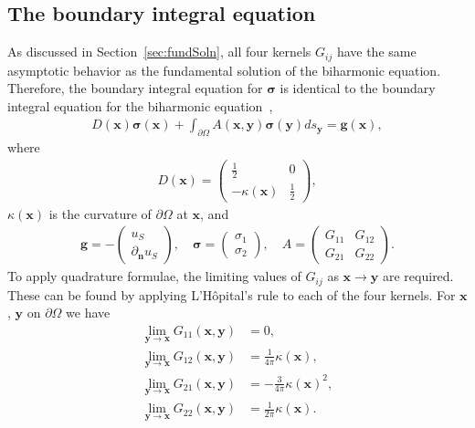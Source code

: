 \documentclass[times]{article}
\newcommand{\bd}{\partial}
\renewcommand{\gg}{\mathbf{g}}
\newcommand{\nn}{\mathbf{n}}
\newcommand{\ssigma}{\boldsymbol{\sigma}}
\newcommand{\xx}{\mathbf{x}}
\newcommand{\yy}{\mathbf{y}}
\begin{document}
\subsection{The boundary integral equation}
\label{sec:BIE}

As discussed in Section~\ref{sec:fundSoln}, all four kernels $G_{ij}$
have the same asymptotic behavior as the fundamental solution of the
biharmonic equation.  Therefore, the boundary integral equation for
$\ssigma$ is identical to the boundary integral equation for the
biharmonic equation~\cite{far1989},
\begin{align}
  \label{eqn:bie}
  D(\xx)\ssigma(\xx) + \int_{\bd\Omega} A(\xx,\yy)\ssigma(\yy) ds_{\yy}
    =\gg(\xx),
\end{align}
where
\begin{align*}
  D(\xx) = \left(
  \begin{array}{cc}
    \displaystyle\frac{1}{2} & 0 \\ -\kappa(\xx) & \displaystyle\frac{1}{2}
  \end{array}
  \right),
\end{align*}
$\kappa(\xx)$ is the curvature of $\bd\Omega$ at $\xx$, and 
\begin{align*}
  \gg = -\left(
  \begin{array}{c}
    u_S \\ \partial_{\nn}u_S
  \end{array}
  \right),
  \quad 
  \ssigma = \left(
  \begin{array}{c}
    \sigma_{1} \\ \sigma_{2}
  \end{array}
  \right),
  \quad
  A = \left(
  \begin{array}{cc}
    G_{11} & G_{12} \\ 
    G_{21} & G_{22}
  \end{array}
  \right).
\end{align*}
To apply quadrature formulae, the limiting values of $G_{ij}$ as $\xx\to\yy$ are
required.  These can be found by applying L'H\^{o}pital's rule to each
of the four kernels.  For $\xx$, $\yy$ on $\bd\Omega$ we have
\begin{equation}
  \label{eqn:limits}
  \begin{aligned}
    \lim_{\yy \rightarrow \xx} G_{11}(\xx,\yy) &= 0, \\
    \lim_{\yy \rightarrow \xx} G_{12}(\xx,\yy) &=
    \frac{1}{4\pi}\kappa(\xx), \\
    \lim_{\yy \rightarrow \xx} G_{21}(\xx,\yy) &=
    -\frac{3}{4\pi}\kappa(\xx)^2, \\
    \lim_{\yy \rightarrow \xx} G_{22}(\xx,\yy) &=
    \frac{1}{2\pi}\kappa(\xx).
  \end{aligned}
\end{equation}
\end{document}
